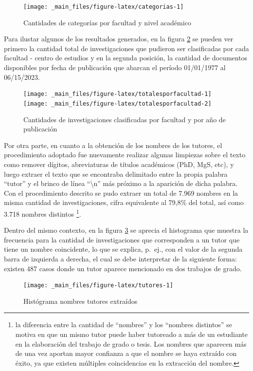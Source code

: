 \documentclass[
  12pt,
  openany]{book}
\begin{document}
\begin{figure}
\texttt{[image: \_main\_files/figure-latex/categorias-1]} \caption{Cantidades de categorías por facultad y nivel académico}\label{fig:categorias}
\end{figure}

Para ilustar algunos de los resultados generados, en la figura \ref{fig:totalesporfacultad} se pueden ver primero la cantidad total de investigaciones que pudieron ser clasificadas por cada facultad - centro de estudios y en la segunda posición, la cantidad de documentos disponibles por fecha de publicación que abarcan el período 01/01/1977 al 06/15/2023.

\begin{figure}
\texttt{[image: \_main\_files/figure-latex/totalesporfacultad-1]} \texttt{[image: \_main\_files/figure-latex/totalesporfacultad-2]} \caption{Cantidades de investigaciones clasificadas por facultad y por año de publicación}\label{fig:totalesporfacultad}
\end{figure}

Por otra parte, en cuanto a la obtención de los nombres de los tutores, el procedimiento adoptado fue nuevamente realizar algunas limpiezas sobre el texto como remover dígitos, abreviaturas de títulos académicos (PhD, MgS, etc), y luego extraer el texto que se encontraba delimitado entre la propia palabra ``tutor'' y el brinco de línea ``\textbackslash n'' más próximo a la aparición de dicha palabra. Con el procedimiento descrito se pudo extraer un total de 7.969 nombres en la misma cantidad de investigaciones, cifra equivalente al 79,8\% del total, así como 3.718 nombres distintos \footnote{la diferencia entre la cantidad de ``nombres'' y los ``nombres distintos'' se motiva en que un mismo tutor puede haber tutoreado a más de un estudiante en la elaboración del trabajo de grado o tesis. Los nombres que aparecen más de una vez aportan mayor confianza a que el nombre se haya extraído con éxito, ya que existen múltiples coincidencias en la extracción del nombre.}.

Dentro del mismo contexto, en la figura \ref{fig:tutores} se aprecia el histograma que muestra la frecuencia para la cantidad de investigaciones que corresponden a un tutor que tiene un nombre coincidente, lo que se explica, p.~ej., con el valor de la segunda barra de izquierda a derecha, el cual se debe interpretar de la siguiente forma: existen 487 casos donde un tutor aparece mencionado en dos trabajos de grado.

\begin{figure}
\texttt{[image: \_main\_files/figure-latex/tutores-1]} \caption{Histógrama nombres tutores extraídos }\label{fig:tutores}
\end{figure}
\end{document}

